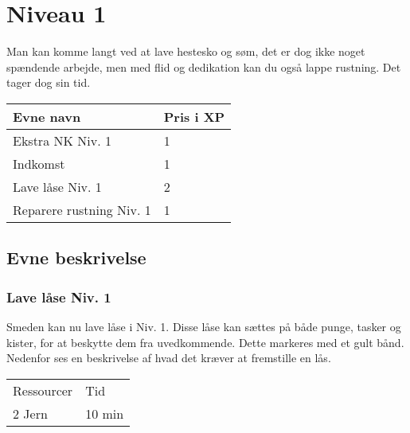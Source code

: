 \chapter{Niveau 1}
Man kan komme langt ved at lave hestesko og søm, det er dog ikke noget spændende arbejde, men med flid og dedikation kan du også lappe rustning. Det tager dog sin tid.
\begin{table}[H]
    \centering
    \begin{tabular}{|p{}|p{}|}
    \rowcolor{cerulean!80}\hline
        Evne navn & Pris i XP \\\hline
         Ekstra NK Niv. 1 & 1 \\\hline
         Indkomst & 1\\\hline
         Lave låse Niv. 1 & 2\\\hline
         Reparere rustning Niv. 1 & 1\\\hline
    \end{tabular}
\end{table}

\section{Evne beskrivelse}





\subsection{Lave låse Niv. 1}
Smeden kan nu lave låse i Niv. 1. Disse låse kan sættes på både punge, tasker og kister, for at beskytte dem fra uvedkommende. Dette markeres med et gult bånd.
Nedenfor ses en beskrivelse af hvad det kræver at fremstille en lås.\\

\begin{table}[H]
    \centering
    \begin{tabular}{|p{}|p{}|}
    \hline
    \rowcolor{cerulean!80}
    \multicolumn{2}{c}{Lås Niv. 1}\\
    \hline
    \rowcolor{cerulean!40}
         Ressourcer & Tid \\\hline
         2 Jern & 10 min\\\hline
    \end{tabular}
    \end{table}

